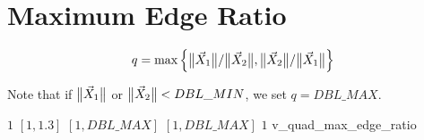 \section{Maximum Edge Ratio}

\[
q = \max \left\{  \big\lVert{\vec X_1 }\big\rVert / \big\lVert{\vec X_2 }\big\rVert, 
                  \big\lVert{\vec X_2 }\big\rVert / \big\lVert{\vec X_1 }\big\rVert \right\} 
\]

Note that if $\big\lVert{\vec X_1}\big\rVert$ or $\big\lVert{\vec X_2}\big\rVert < DBL\_MIN$, we set $q = DBL\_MAX$.

%
{$1$}%
{$[1,1.3]$}%
{$[1,DBL\_MAX]$}%
{$[1,DBL\_MAX]$}%
{$1$}%
{\cite{rob:87}}%
{v\_quad\_max\_edge\_ratio}%

